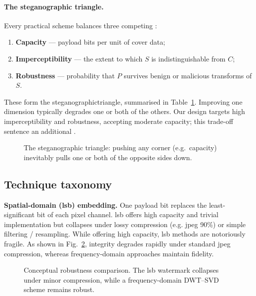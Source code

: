 \paragraph{The steganographic triangle.} Every practical scheme balances three competing :
\begin{enumerate}[label=(\roman*)]
  \item \textbf{Capacity} — payload bits per unit of cover data;
  \item \textbf{Imperceptibility} — the extent to which $S$ is indistinguishable from $C$;
  \item \textbf{Robustness} — probability that $P$ survives benign or malicious transforms of $S$.
\end{enumerate}
These form the \gls{steganographictriangle}, summarised in Table~\ref{tab:steganographic_triangle}.
Improving one dimension typically degrades one or both of the others.
Our design targets high imperceptibility and robustness, accepting moderate capacity; this trade-off sentence  an additional .

\begin{figure}[ht]
    \centering
    
    \caption[Steganographic trade-off triangle]{The steganographic
    triangle: pushing any corner (e.g.\ capacity) inevitably pulls one or
    both of the opposite sides down.}
    \label{tab:steganographic_triangle}
\end{figure}

\subsection*{Technique taxonomy}

\textbf{Spatial-domain (\gls{lsb}) embedding.} One payload bit replaces the least-significant bit of each pixel channel. \gls{lsb} offers high capacity and trivial implementation but collapses under lossy compression (e.g. \gls{jpeg} 90\%) or simple filtering / resampling.
While offering high capacity, \gls{lsb} methods are notoriously fragile.
As shown in Fig.~\ref{fig:lsb_vs_dct_robustness}, integrity degrades rapidly under standard \gls{jpeg} compression, whereas frequency-domain approaches maintain fidelity.

\begin{figure}[ht]
  \centering
  
  \caption{Conceptual robustness comparison. The \gls{lsb} watermark collapses under minor compression, while a frequency-domain DWT–SVD scheme remains robust.}
  \label{fig:lsb_vs_dct_robustness}
\end{figure}

